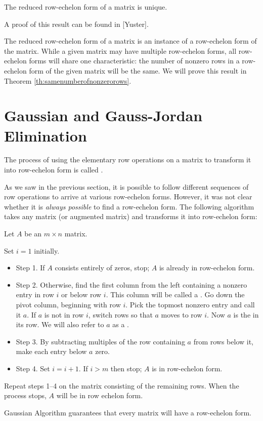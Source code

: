 \documentclass{ximera}
\begin{document}
\begin{theorem}\label{th:uniquenessofrref} The reduced row-echelon form of a matrix is unique.
\end{theorem}
A proof of this result can be found in [Yuster]. 

The reduced row-echelon form of a matrix is an instance of a row-echelon form of the matrix.  While a given matrix may have multiple row-echelon forms, all row-echelon forms will share one characteristic: the number of nonzero rows in a row-echelon form of the given matrix will be the same.
We will prove this result in Theorem \ref{th:samenumberofnonzerorows}.

\section*{Gaussian and Gauss-Jordan Elimination}

\begin{definition}\label{def:GaussianElimination}
The process of using the elementary row operations on a matrix to transform it into row-echelon form is called .
\end{definition}

As we saw in the previous section, it is possible to follow different sequences of row operations to arrive at various row-echelon forms.  However, it was not clear whether it is {\it always possible} to find a row-echelon form.  The following algorithm takes any matrix (or augmented matrix) and transforms it into row-echelon form:
\begin{algorithm} \label{alg:gaussian} 
Let $A$ be an $m\times n$ matrix.

Set $i=1$ initially.
\begin{itemize}
\item[] Step 1. If $A$ consists entirely of zeros, stop;  $A$ is already in row-echelon form.

\item[] Step 2. Otherwise, find the first column from the left containing a nonzero entry in row $i$ or below row $i$.  This column will be called a .  Go down the pivot column, beginning with row $i$. Pick the topmost nonzero entry and call it $a$. If $a$ is not in row $i$, switch rows so that $a$ moves to row $i$.  Now $a$ is the  in its row.  We will also refer to $a$ as a .  

\item[] Step 3. By subtracting multiples of the row containing $a$ from rows below it, make each entry below $a$ zero.

\item[] Step 4.  Set $i=i+1$.  If $i>m$ then stop; $A$ is in row-echelon form.

\end{itemize}

Repeat steps 1--4 on the matrix consisting of the remaining rows.
When the process stops, $A$ will be in row echelon form.
\end{algorithm}
Gaussian Algorithm guarantees that every matrix will have a row-echelon form.  
\end{document}
